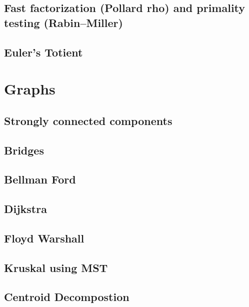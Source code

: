 \documentclass[10pt]{extarticle}
\begin{document}
\begin{multicols*}{2}
\subsection{Fast factorization (Pollard rho) and primality testing
(Rabin--Miller)} %


\subsection{Euler's Totient} %


\section{Graphs}

\subsection{Strongly connected components} %


\subsection{Bridges} %


\subsection{Bellman Ford}


\subsection{Dijkstra}


\subsection{Floyd Warshall}


\subsection{Kruskal using MST}


\subsection{Centroid Decompostion}



\end{multicols*}
\end{document}
